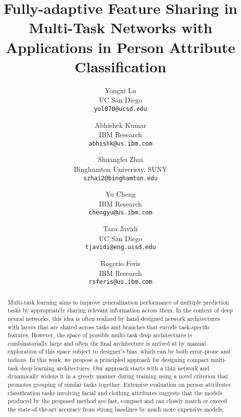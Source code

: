 \documentclass[10pt,twocolumn,letterpaper]{article}
\begin{document}
\title{Fully-adaptive Feature Sharing in Multi-Task Networks with Applications in Person Attribute Classification}

\author{Yongxi Lu\\
UC San Diego\\
{\tt\small yol070@ucsd.edu}
\and
Abhishek Kumar\\
IBM Research\\
{\tt\small abhishk@us.ibm.com}
\and
Shuangfei Zhai \\
Binghamton Univeristy, SUNY\\
{\tt\small szhai2@binghamton.edu}
\and
Yu Cheng\\
IBM Research \\
{\tt\small chengyu@us.ibm.com}
\and
Tara Javidi\\
UC San Diego\\
{\tt\small tjavidi@eng.ucsd.edu}
\and
Rogerio Feris\\
IBM Research\\
{\tt\small rsferis@us.ibm.com}
}

\maketitle

\vspace{-0.2in}
\begin{abstract}
	Multi-task learning aims to improve generalization performance of multiple prediction tasks
	by appropriately sharing relevant information across them.
	In the context of deep neural networks,
	this idea is often realized by hand-designed
	network architectures with layers that are shared across tasks and branches that encode task-specific features.
	However, the space of possible multi-task deep architectures is combinatorially large
	and often the final architecture is arrived at by manual exploration of this space
	subject to designer's bias, which can be both error-prone and tedious.
	In this work, we propose a principled approach for designing compact multi-task deep learning
	architectures.
	Our approach starts with a thin network and dynamically widens it in a greedy manner during training using a novel
	criterion that promotes grouping of similar tasks together.
	Extensive
	evaluation on person attributes classification tasks involving facial and clothing attributes
	suggests that the models produced by the proposed method are fast, compact and can closely match or exceed the
	state-of-the-art accuracy from strong baselines by much more expensive models. 
	
\end{abstract}
\end{document}
